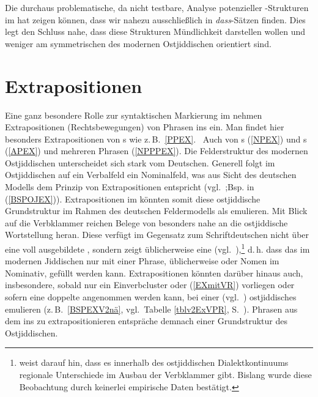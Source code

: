 Die durchaus problematische, 
da nicht testbare, %
Analyse potenzieller -Struk\-turen im \hai{{\LiJi}} hat zeigen können, dass wir  nahezu ausschließlich in \textit{dass}-Sätzen finden. Dies legt den Schluss nahe, dass diese Strukturen Mündlichkeit darstellen wollen und weniger am symmetrischen  des modernen Ostjiddischen orientiert sind.  

 

 \section{Extrapositionen}\label{VOOV}
 Eine ganz besondere Rolle zur syntaktischen Markierung im \hai{{\LiJi}} nehmen Extrapositionen (Rechtsbewegungen) von Phrasen ins  ein. Man findet hier besonders Extrapositionen von \hai{{\PP}}s wie z.\,B.\, \ref{PPEX}. \,%
 Auch von \hai{{\NP}}s (\ref{NPEX}) und \hai{{\AP}}s (\ref{APEX}) und mehreren Phrasen (\ref{NPPPEX}). Die Felderstruktur des modernen Ost\-jid\-dischen unterscheidet sich stark vom Deutschen. Generell folgt im Ostjiddischen auf ein Verbalfeld ein Nominalfeld, was aus Sicht des deutschen Modells dem Prinzip von Extrapositionen entspricht (vgl.\, \citealt{Krogh2008};Bsp. in (\ref{BSPOJEX})). Extrapositionen im \hai{{\LiJi}} könnten somit diese ostjiddische Grundstruktur im Rahmen des deutschen Feldermodells als  emulieren. Mit Blick auf die Verbklammer reichen Belege von  besonders nahe an die ostjiddische Wortstellung heran. Diese verfügt im Gegensatz zum Schriftdeutschen nicht über eine voll ausgebildete , sondern zeigt üblicherweise eine  (vgl.\, \citealt[14–16]{Reershemius2005}),\footnote{\citealt[381]{Mark1978} weist darauf hin, dass es innerhalb des ostjiddischen Dialektkontinuums regionale Unterschiede im Ausbau der Verbklammer gibt. Bislang wurde diese Beobachtung durch keinerlei empirische Daten bestätigt.} d.\,h. dass das \hai{{\MF}} im modernen Jiddischen nur mit einer Phrase, üblicherweise   oder Nomen im Nominativ, gefüllt werden kann. Extrapositionen könnten darüber hinaus auch, insbesondere, sobald nur ein Einverbcluster oder \hai{{\VR}} (\ref{EXmitVR}) vorliegen oder sofern eine doppelte \hai{{\LSK}} angenommen werden kann,  bei einer  (vgl.\, \citealt[14]{Reershemius2005}) ostjiddisches  emulieren (z.\,B.\, \ref{BSPEXV2nä}, vgl.\, Tabelle \ref{tblv2ExVPR}, S.\, \pageref{tblv2ExVPR}). Phrasen aus dem  ins  zu extrapositionieren entspräche demnach einer Grundstruktur des Ostjiddischen. 		


